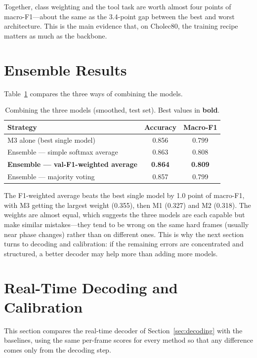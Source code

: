 Together, class weighting and the tool task are worth almost four points of macro-F1---about the same as the 3.4-point gap between the best and worst architecture. This is the main evidence that, on Cholec80, the training recipe matters as much as the backbone.

\section{Ensemble Results}

Table~\ref{tab:ensemble} compares the three ways of combining the models.

\begin{table}[H]
\centering
\caption{Combining the three models (smoothed, test set). Best values in \textbf{bold}.}
\label{tab:ensemble}
\begin{tabular}{lcc}
\toprule
\textbf{Strategy} & \textbf{Accuracy} & \textbf{Macro-F1} \\
\midrule
M3 alone (best single model)              & 0.856 & 0.799 \\
Ensemble --- simple softmax average       & 0.863 & 0.808 \\
\textbf{Ensemble --- val-F1-weighted average} & \textbf{0.864} & \textbf{0.809} \\
Ensemble --- majority voting              & 0.857 & 0.799 \\
\bottomrule
\end{tabular}
\end{table}

The F1-weighted average beats the best single model by 1.0 point of macro-F1, with M3 getting the largest weight (0.355), then M1 (0.327) and M2 (0.318). The weights are almost equal, which suggests the three models are each capable but make similar mistakes---they tend to be wrong on the same hard frames (usually near phase changes) rather than on different ones. This is why the next section turns to decoding and calibration: if the remaining errors are concentrated and structured, a better decoder may help more than adding more models.

\section{Real-Time Decoding and Calibration}
\label{sec:calibration}

This section compares the real-time decoder of Section~\ref{sec:decoding} with the baselines, using the same per-frame scores for every method so that any difference comes only from the decoding step.

